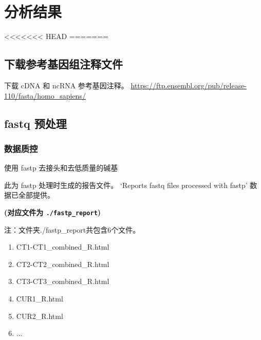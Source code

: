 \documentclass[
]{article}
\providecommand{\tightlist}{%
  \setlength{\itemsep}{0pt}\setlength{\parskip}{0pt}}
\begin{document}
\hypertarget{results}{%
\section{分析结果}\label{results}}

<<<<<<< HEAD
=======
\hypertarget{ux4e0bux8f7dux53c2ux8003ux57faux56e0ux7ec4ux6ce8ux91caux6587ux4ef6}{%
\subsection{下载参考基因组注释文件}\label{ux4e0bux8f7dux53c2ux8003ux57faux56e0ux7ec4ux6ce8ux91caux6587ux4ef6}}

下载 cDNA 和 ncRNA 参考基因注释。
\url{https://ftp.ensembl.org/pub/release-110/fasta/homo_sapiens/}

\hypertarget{fastq-ux9884ux5904ux7406}{%
\subsection{fastq 预处理}\label{fastq-ux9884ux5904ux7406}}

\hypertarget{ux6570ux636eux8d28ux63a7}{%
\subsubsection{数据质控}\label{ux6570ux636eux8d28ux63a7}}

使用 fastp 去接头和去低质量的碱基

此为 fastp 处理时生成的报告文件。
`Reports fastq files processed with fastp' 数据已全部提供。

\textbf{(对应文件为 \texttt{./fastp\_report})}

\begin{center}\begin{tcolorbox}[colback=gray!10, colframe=gray!50, width=0.9\linewidth, arc=1mm, boxrule=0.5pt]注：文件夹./fastp\_report共包含6个文件。

\begin{enumerate}\tightlist
\item CT1-CT1\_combined\_R.html
\item CT2-CT2\_combined\_R.html
\item CT3-CT3\_combined\_R.html
\item CUR1\_R.html
\item CUR2\_R.html
\item ...
\end{enumerate}\end{tcolorbox}
\end{center}
\end{document}

